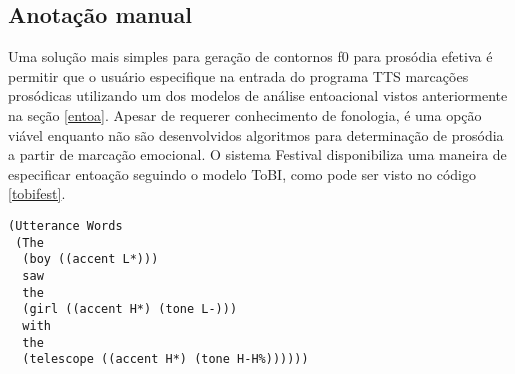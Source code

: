 
\subsection{Anotação manual}
Uma solução mais simples para geração de contornos f0 para prosódia efetiva é
permitir que o usuário especifique na entrada do programa TTS marcações
prosódicas utilizando um dos modelos de análise entoacional vistos
anteriormente na seção \ref{entoa}. Apesar de requerer conhecimento de fonologia, é uma opção 
viável enquanto não são desenvolvidos algoritmos para determinação de prosódia a
partir de marcação emocional. O sistema Festival \cite{festival} disponibiliza
uma maneira de especificar entoação seguindo o modelo ToBI, como pode ser visto
no código
\ref{tobifest}.

\begin{lstlisting}[caption=Anotações no modelo ToBI para o sistema TTS Festival,
  label=tobifest]
(Utterance Words 
 (The
  (boy ((accent L*)))
  saw
  the
  (girl ((accent H*) (tone L-)))
  with 
  the
  (telescope ((accent H*) (tone H-H%))))))
\end{lstlisting}

